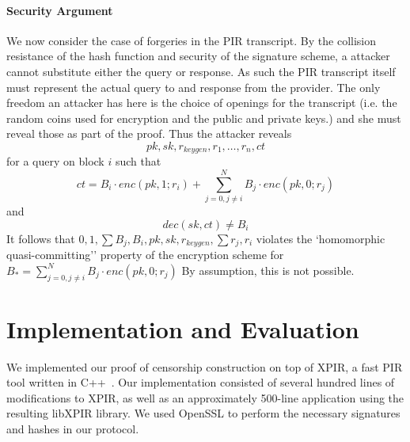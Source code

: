 \paragraph{Security Argument} 

We now consider the case of forgeries in the PIR transcript.  By the collision
resistance of the hash function and security of the signature scheme, a attacker
cannot substitute  either the query or response. As such the PIR transcript
itself must represent the actual query to and response from the provider. The
only freedom an attacker has here is the choice of openings for the transcript
(i.e. the random coins used for encryption and the public and private keys.) and
she must reveal those as part of the proof. Thus the attacker reveals
$$pk,sk,r_{keygen},r_1,\ldots,r_n,ct$$ for a query on block $i$ such that
$$ct=B_i\cdot enc(pk,1;r_i) + \sum_{j=0,j\ne i}^{N}  B_j\cdot enc(pk,0;r_j) $$
and $$dec(sk,ct) \ne B_i$$ It follows that $0,1,\sum B_j,\allowbreak
B_i,pk,sk,r_{keygen}, \sum r_j ,r_i$ violates the `homomorphic quasi-committing''
property of the encryption scheme for $B_*= \sum_{j=0,j\ne i}^{N}  B_j\cdot
enc(pk,0;r_j)$ By assumption, this is not possible.
%

\section{Implementation and Evaluation}

We implemented our proof of censorship construction on top of XPIR, a fast PIR
tool written in C++~\cite{xpir}. Our implementation consisted of several hundred
lines of modifications to XPIR, as well as an approximately 500-line application
using the resulting libXPIR library. We used OpenSSL to perform the necessary
signatures and hashes in our protocol.


